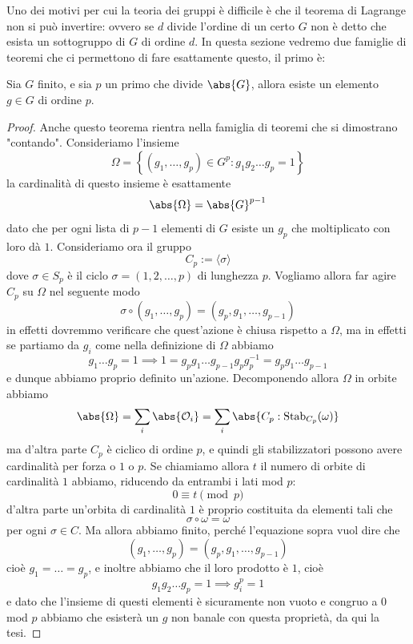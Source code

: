 \documentclass[11pt]{scrartcl}
\begin{document}
	 Uno dei motivi per cui la teoria dei gruppi è difficile è che il teorema di Lagrange non si può invertire: ovvero se $d$ divide l'ordine di un certo $G$ non è detto che esista un sottogruppo di $G$ di ordine $d$. In questa sezione vedremo due famiglie di teoremi che ci permettono di fare esattamente questo, il primo è:
	 \begin{theorem}
	 	Sia $G$ finito, e sia $p$ un primo che divide $\abs{G}$, allora esiste un elemento $g \in G$ di ordine $p$.
	 \end{theorem}
	 \begin{proof}
	 	Anche questo teorema rientra nella famiglia di teoremi che si dimostrano "contando". Consideriamo l'insieme 
	 	$$\Omega=\left\{\left(g_1,\dots,g_p\right)\in G^p:g_1g_2\dots g_p=1\right\}$$
	 	la cardinalità di questo insieme è esattamente 
	 	$$\abs{\Omega}=\abs{G}^{p-1}$$
	 	dato che per ogni lista di $p-1$ elementi di $G$ esiste un $g_p$ che moltiplicato con loro dà $1$. Consideriamo ora il gruppo 
	 	$$C_p:=\langle \sigma \rangle$$
	 	dove $\sigma\in S_p$ è il ciclo $\sigma=\left(1,2,\dots,p\right)$ di lunghezza $p$. Vogliamo allora far agire $C_p$ su $\Omega$ nel seguente modo
	 	$$\sigma\circ \left(g_1,\dots,g_p\right)=\left(g_p,g_1,\dots,g_{p-1}\right)$$
	 	in effetti dovremmo verificare che quest'azione è chiusa rispetto a $\Omega$, ma in effetti se partiamo da $g_i$ come nella definizione di $\Omega$ abbiamo
	 	$$g_1\dots g_p=1 \implies 1=g_pg_1\dots g_{p-1}g_pg_p^{-1}=g_pg_1\dots g_{p-1}$$
	 	e dunque abbiamo proprio definito un'azione. Decomponendo allora $\Omega$ in orbite abbiamo
	 	$$\abs{\Omega}=\sum_{i}\abs{\mathcal{O}_i}=\sum_{i} \abs{C_p:\text{Stab}_{C_p}(\omega)}$$
	 	ma d'altra parte $C_p$ è ciclico di ordine $p$, e quindi gli stabilizzatori possono avere cardinalità per forza o $1$ o $p$. Se chiamiamo allora $t$ il numero di orbite di cardinalità $1$ abbiamo, riducendo da entrambi i lati mod $p$:
	 	$$0\equiv t \pmod{p}$$
	 	d'altra parte un'orbita di cardinalità $1$ è proprio costituita da elementi tali che
	 	$$\sigma\circ \omega=\omega$$
	 	per ogni $\sigma\in C$. Ma allora abbiamo finito, perché l'equazione sopra vuol dire che
	 	$$\left(g_1,\dots,g_p\right)=\left(g_{p},g_1,\dots,g_{p-1}\right)$$
	 	cioè $g_1=\dots = g_p$, e inoltre abbiamo che il loro prodotto è $1$, cioè
	 	$$g_1g_2\dots g_p=1 \implies g_i^p=1$$
	 	e dato che l'insieme di questi elementi è sicuramente non vuoto e congruo a $0$ mod $p$ abbiamo che esisterà un $g$ non banale con questa proprietà, da qui la tesi.
	 \end{proof}
\end{document}
